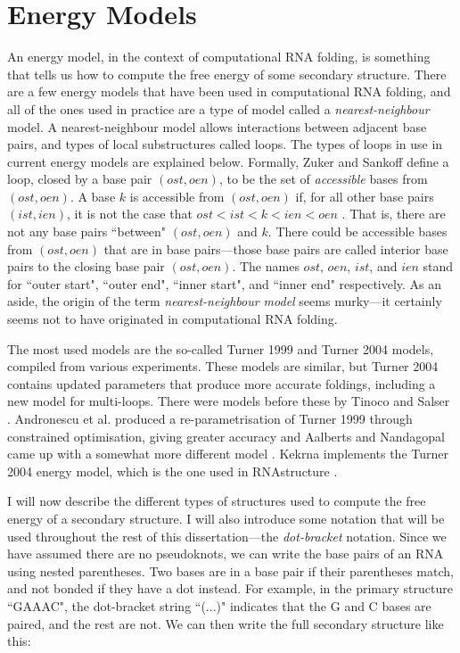 \documentclass{cshonours}
\def\etal{et al. }
\begin{document}
\chapter{Energy Models}
\label{chap:energy}
An energy model, in the context of computational RNA folding, is something that tells us how to compute the free energy of some secondary structure. There are a few energy models that have been used in computational RNA folding, and all of the ones used in practice are a type of model called a \emph{nearest-neighbour} model. A nearest-neighbour model allows interactions between adjacent base pairs, and types of local substructures called loops. The types of loops in use in current energy models are explained below. Formally, Zuker and Sankoff define a loop, closed by a base pair $(ost, oen)$, to be the set of \emph{accessible} bases from $(ost, oen)$. A base $k$ is accessible from $(ost, oen)$ if, for all other base pairs $(ist, ien)$, it is not the case that $ost < ist < k < ien < oen$ \cite{zukerSankoff}. That is, there are not any base pairs ``between" $(ost, oen)$ and $k$. There could be accessible bases from $(ost, oen)$ that are in base pairs---those base pairs are called interior base pairs to the closing base pair $(ost, oen)$. The names $ost$, $oen$, $ist$, and $ien$ stand for ``outer start", ``outer end", ``inner start", and ``inner end" respectively. As an aside, the origin of the term \emph{nearest-neighbour model} seems murky---it certainly seems not to have originated in computational RNA folding.

The most used models are the so-called Turner 1999 \cite{t99} and Turner 2004 \cite{t04} models, compiled from various experiments. These models are similar, but Turner 2004 contains updated parameters that produce more accurate foldings, including a new model for multi-loops. There were models before these by Tinoco \cite{tinocoImprovedModel} and Salser \cite{salser}. Andronescu \etal produced a re-parametrisation of Turner 1999 through constrained optimisation, giving greater accuracy \cite{andronescuModel} and Aalberts and Nandagopal came up with a somewhat more different model \cite{aalbertsModel}. Kekrna implements the Turner 2004 energy model, which is the one used in RNAstructure \cite{rnastructure}.

I will now describe the different types of structures used to compute the free energy of a secondary structure. I will also introduce some notation that will be used throughout the rest of this dissertation---the \emph{dot-bracket} notation. Since we have assumed there are no pseudoknots, we can write the base pairs of an RNA using nested parentheses. Two bases are in a base pair if their parentheses match, and not bonded if they have a dot instead. For example, in the primary structure ``GAAAC", the dot-bracket string ``(...)" indicates that the G and C bases are paired, and the rest are not. We can then write the full secondary structure like this:
\end{document}

